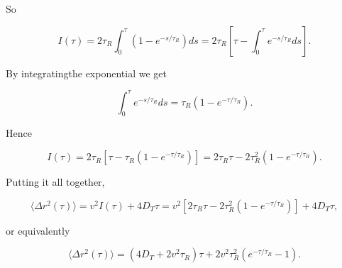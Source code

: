 \documentclass[
  letterpaper,
  enabledeprecatedfontcommands]{report}
\begin{document}
\begin{tcolorbox}
So

\[
I(\tau) = 2 \tau_R \int_0^\tau \left(1 - e^{-s/\tau_R}\right) ds = 2 \tau_R \left[ \tau - \int_0^\tau e^{-s/\tau_R} ds \right].
\]

By integratingthe exponential we get

\[
\int_0^\tau e^{-s/\tau_R} ds = \tau_R \left(1 - e^{-\tau/\tau_R}\right).
\]

Hence

\[
I(\tau) = 2 \tau_R \left[ \tau - \tau_R \left(1 - e^{-\tau/\tau_R} \right) \right] = 2 \tau_R \tau - 2 \tau_R^2 \left(1 - e^{-\tau/\tau_R} \right).
\]

Putting it all together,

\[
\langle \Delta r^2(\tau) \rangle = v^2 I(\tau) + 4 D_T \tau = v^2 \left[ 2 \tau_R \tau - 2 \tau_R^2 (1 - e^{-\tau/\tau_R}) \right] + 4 D_T \tau,
\]

or equivalently

\[
\boxed{
\langle \Delta r^2(\tau) \rangle = \left(4 D_T + 2 v^2 \tau_R \right) \tau + 2 v^2 \tau_R^2 \left( e^{-\tau/\tau_R} - 1 \right).
}
\]

\end{tcolorbox}
\end{document}
